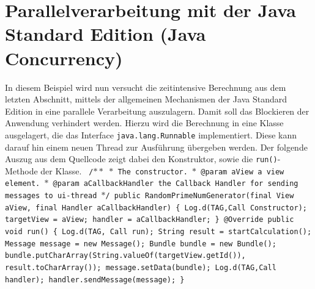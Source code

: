 \documentclass[12pt,oneside,a4paper,bibtotoc,liststotoc]{scrreprt}
\begin{document}
\section{Parallelverarbeitung mit der Java Standard Edition (Java Concurrency)}
In diesem Beispiel wird nun versucht die zeitintensive Berechnung aus dem letzten Abschnitt, mittels der allgemeinen Mechanismen der Java Standard Edition in eine parallele Verarbeitung auszulagern. Damit soll das Blockieren der Anwendung verhindert werden. Hierzu wird die Berechnung in eine Klasse ausgelagert, die das Interface \texttt{java.lang.Runnable} implementiert. Diese kann darauf hin einem neuen Thread zur Ausführung übergeben werden. Der folgende Auszug aus dem Quellcode zeigt dabei den Konstruktor, sowie die \texttt{run()}- Methode der Klasse.\newline\newline\newline\newline\newline\newline
\texttt{
/$\ast\ast$\newline
$\ast$ The constructor.\newline
$\ast$ @param aView a view element.\newline
$\ast$ @param aCallbackHandler the Callback Handler for sending messages to ui-thread $\ast$/ %
public RandomPrimeNumGenerator(final View aView, final Handler aCallbackHandler)\newline
\{ \newline
 Log.d(TAG,\grqq Call Constructor\grqq );\newline
 targetView = aView;\newline
 handler = aCallbackHandler;\newline
\} \newline
  @Override\newline
  public void run()\newline
  \{ \newline
     Log.d(TAG, \grqq Call run\grqq);\newline
       String result = startCalculation();\newline
       Message message = new Message();\newline
       Bundle bundle = new Bundle();\newline
       bundle.putCharArray(String.valueOf(targetView.getId()), result.toCharArray());\newline
       message.setData(bundle);\newline
       Log.d(TAG,\grqq Call handler\grqq );\newline
       handler.sendMessage(message);\newline
   \} \newline\newline
} \newline
\end{document}
